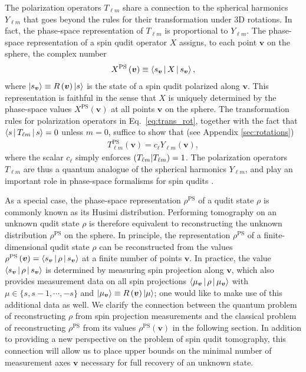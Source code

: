 \documentclass[a4paper,twocolumn,unpublished]{quantumarticle}
\renewcommand{\t}{\text} %
\newcommand{\p}[1]{\left(#1\right)} %
\newcommand{\bk}{\Braket} %
\renewcommand{\set}[1]{\{#1\}} %
\def\obk#1{\mathinner{({#1})}}
\begin{document}
The polarization operators $T_{\ell m}$ share a connection to the spherical harmonics $Y_{\ell m}$ that goes beyond the rules for their transformation under 3D rotations.
In fact, the phase-space representation of $T_{\ell m}$ is proportional to $Y_{\ell m}$.
The phase-space representation of a spin qudit operator $X$ assigns, to each point $\bm v$ on the sphere, the complex number
\begin{align}
  X^{\t{PS}}\p{\bm v} \equiv \bk{s_{\bm v}|X|s_{\bm v}},
\end{align}
where $\ket{s_{\bm v}}\equiv R\p{\bm v}\ket{s}$ is the state of a spin qudit polarized along $\bm v$.
This representation is faithful in the sense that $X$ is uniquely determined by the phase-space values $X^{\t{PS}}\p{\bm v}$ at all points $\bm v$ on the sphere.
The transformation rules for polarization operators in Eq.~\eqref{eq:trans_rot}, together with the fact that $\bk{s|T_{\ell m}|s}=0$ unless $m=0$, suffice to show that (see Appendix \ref{sec:rotations})
\begin{align}
  T_{\ell m}^{\t{PS}}\p{\bm v} = c_\ell Y_{\ell m}\p{\bm v},
\end{align}
where the scalar $c_\ell$ simply enforces $\obk{T_{\ell m}|T_{\ell m}}=1$.
The polarization operators $T_{\ell m}$ are thus a quantum analogue of the spherical harmonics $Y_{\ell m}$, and play an important role in phase-space formalisms for spin qudits \cite{li2013weylwignermoyal}.

As a special case, the phase-space representation $\rho^{\t{PS}}$ of a qudit state $\rho$ is commonly known as its Husimi distribution.
Performing tomography on an unknown qudit state $\rho$ is therefore equivalent to reconstructing the unknown distribution $\rho^{\t{PS}}$ on the sphere.
In principle, the representation $\rho^{\t{PS}}$ of a finite-dimensional qudit state $\rho$ can be reconstructed from the values $\rho^{\t{PS}}\p{\bm v}=\bk{s_{\bm v}|\rho|s_{\bm v}}$ at a finite number of points $\bm v$.
In practice, the value $\bk{s_{\bm v}|\rho|s_{\bm v}}$ is determined by measuring spin projection along $\bm v$, which also provides measurement data on all spin projections $\bk{\mu_{\bm v}|\rho|\mu_{\bm v}}$ with $\mu\in\set{s,s-1,\cdots,-s}$ and $\ket{\mu_{\bm v}}\equiv R\p{\bm v}\ket{\mu}$; one would like to make use of this additional data as well.
We clarify the connection between the quantum problem of reconstructing $\rho$ from spin projection measurements and the classical problem of reconstructing $\rho^{\t{PS}}$ from its values $\rho^{\t{PS}}\p{\bm v}$ in the following section.
In addition to providing a new perspective on the problem of spin qudit tomography, this connection will allow us to place upper bounds on the minimal number of measurement axes $\bm v$ necessary for full recovery of an unknown state.
\end{document}
